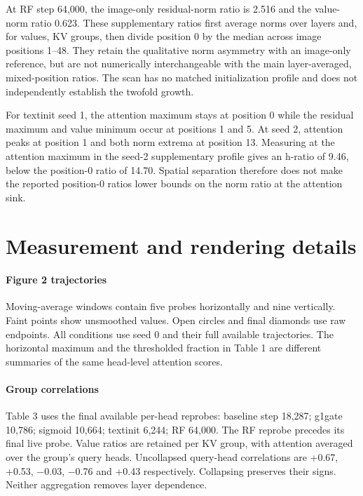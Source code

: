 \documentclass{article}
\begin{document}
At RF step 64,000, the image-only residual-norm ratio is 2.516 and the value-norm ratio 0.623. These supplementary ratios first average norms over layers and, for values, KV groups, then divide position 0 by the median across image positions 1--48. They retain the qualitative norm asymmetry with an image-only reference, but are not numerically interchangeable with the main layer-averaged, mixed-position ratios. The scan has no matched initialization profile and does not independently establish the twofold growth.

For textinit seed 1, the attention maximum stays at position 0 while the residual maximum and value minimum occur at positions 1 and 5. At seed 2, attention peaks at position 1 and both norm extrema at position 13. Measuring at the attention maximum in the seed-2 supplementary profile gives an h-ratio of 9.46, below the position-0 ratio of 14.70. Spatial separation therefore does not make the reported position-0 ratios lower bounds on the norm ratio at the attention sink.

\FloatBarrier
\section{Measurement and rendering details}

\paragraph{Figure 2 trajectories} Moving-average windows contain five probes horizontally and nine vertically. Faint points show unsmoothed values. Open circles and final diamonds use raw endpoints. All conditions use seed 0 and their full available trajectories. The horizontal maximum and the thresholded fraction in Table 1 are different summaries of the same head-level attention scores.

\paragraph{Group correlations} Table 3 uses the final available per-head reprobes: baseline step 18,287; g1gate 10,786; sigmoid 10,664; textinit 6,244; RF 64,000. The RF reprobe precedes its final live probe. Value ratios are retained per KV group, with attention averaged over the group's query heads. Uncollapsed query-head correlations are +0.67, +0.53, $-$0.03, $-$0.76 and +0.43 respectively. Collapsing preserves their signs. Neither aggregation removes layer dependence.
\end{document}
